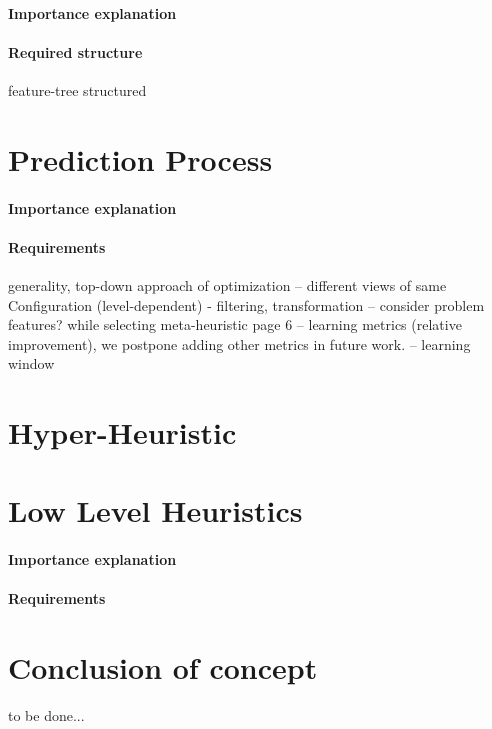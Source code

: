 \paragraph{Importance explanation}
\paragraph{Required structure} feature-tree structured



\section{Prediction Process}\label{concept:prediction}
\paragraph{Importance explanation}
\paragraph{Requirements} generality, top-down approach of optimization
-- different views of same Configuration (level-dependent) - filtering, transformation
-- consider problem features? while selecting meta-heuristic \cite{kerschke2019automated} page 6
-- learning metrics (relative improvement), we postpone adding other metrics in future work.
-- learning window


\section{Hyper-Heuristic}

\section{Low Level Heuristics}\label{concept: llh}
\paragraph{Importance explanation}
\paragraph{Requirements}


\section{Conclusion of concept}
to be done...